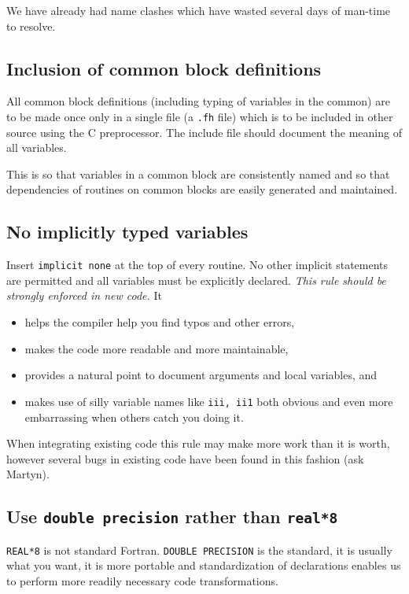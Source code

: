 We have already had name clashes which have wasted several days of
man-time to resolve.

\subsection{Inclusion of common block definitions}

All common block definitions (including typing of variables in the
common) are to be made once only in a single file (a {\tt.fh} file)
which is to be included in other source using the C preprocessor.  The
include file should document the meaning of all variables.  

This is so that variables in a common block are consistently named and
so that dependencies of routines on common blocks are easily generated
and maintained.


\subsection{No implicitly typed variables}

Insert {\tt implicit none} at the top of every routine.  No other
implicit statements are permitted and all variables must be explicitly
declared.  {\em This rule should be strongly enforced in new code.} It
\begin{itemize}
\item helps the compiler help you find typos and other errors,
\item makes the code more readable and more maintainable,
\item provides a natural point to document arguments and local
  variables, and
\item makes use of silly variable names like {\tt iii, ii1} both
  obvious and even more embarrassing when others catch you doing it.
\end{itemize}

When integrating existing code this rule may make more work than it is
worth, however several bugs in existing code have been found in this
fashion (ask Martyn).

\subsection{Use {\tt double precision} rather than {\tt real*8}}

{\tt REAL*8} is not standard Fortran.  {\tt DOUBLE PRECISION} is the
standard, it is usually what you want, it is more portable and
standardization of declarations enables us to perform more readily 
necessary code transformations.

